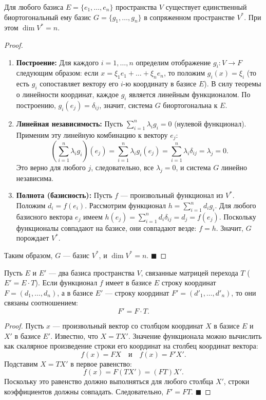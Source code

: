 \begin{theorem}
Для любого базиса $E = \{e_1, \dots, e_n\}$ пространства $V$ существует единственный биортогональный ему базис $G = \{g_1, \dots, g_n\}$ в сопряженном пространстве $V^*$. При этом $\dim V^* = n$.
\end{theorem}

\begin{proof}
\begin{enumerate}
    \item \textbf{Построение:} Для каждого $i = 1, \dots, n$ определим отображение $g_i: V \to F$ следующим образом: если $x = \xi_1 e_1 + \dots + \xi_n e_n$, то положим $g_i(x) = \xi_i$ (то есть $g_i$ сопоставляет вектору его $i$-ю координату в базисе $E$). В силу теоремы о линейности координат, каждое $g_i$ является линейным функционалом. По построению, $g_i(e_j) = \delta_{ij}$, значит, система $G$ биортогональна к $E$.
    \item \textbf{Линейная независимость:} Пусть $\sum_{i=1}^n \lambda_i g_i = 0$ (нулевой функционал). Применим эту линейную комбинацию к вектору $e_j$:
    \[
    \left(\sum_{i=1}^n \lambda_i g_i\right)(e_j) = \sum_{i=1}^n \lambda_i g_i(e_j) = \sum_{i=1}^n \lambda_i \delta_{ij} = \lambda_j = 0.
    \]
    Это верно для любого $j$, следовательно, все $\lambda_j = 0$, и система $G$ линейно независима.
    \item \textbf{Полнота (базисность):} Пусть $f$ --- произвольный функционал из $V^*$. Положим $d_i = f(e_i)$. Рассмотрим функционал $h = \sum_{i=1}^n d_i g_i$. Для любого базисного вектора $e_j$ имеем $h(e_j) = \sum_{i=1}^n d_i \delta_{ij} = d_j = f(e_j)$. Поскольку функционалы совпадают на базисе, они совпадают везде: $f = h$. Значит, $G$ порождает $V^*$.
\end{enumerate}
Таким образом, $G$ --- базис $V^*$, и $\dim V^* = n$.
\hfill$\blacksquare$
\end{proof}

\begin{theorem}
Пусть $E$ и $E'$ --- два базиса пространства $V$, связанные матрицей перехода $T$ ($E' = E \cdot T$). Если функционал $f$ имеет в базисе $E$ строку координат $F = (d_1, \dots, d_n)$, а в базисе $E'$ --- строку координат $F' = (d'_1, \dots, d'_n)$, то они связаны соотношением:
\[
F' = F \cdot T.
\]
\end{theorem}

\begin{proof}
Пусть $x$ --- произвольный вектор со столбцом координат $X$ в базисе $E$ и $X'$ в базисе $E'$. Известно, что $X = T X'$. 
Значение функционала можно вычислить как скалярное произведение строки его координат на столбец координат вектора:
\[
f(x) = F X \quad \text{и} \quad f(x) = F' X'.
\]
Подставим $X = T X'$ в первое равенство:
\[
f(x) = F (T X') = (F T) X'.
\]
Поскольку это равенство должно выполняться для любого столбца $X'$, строки коэффициентов должны совпадать. Следовательно, $F' = F T$.
\hfill$\blacksquare$
\end{proof}
